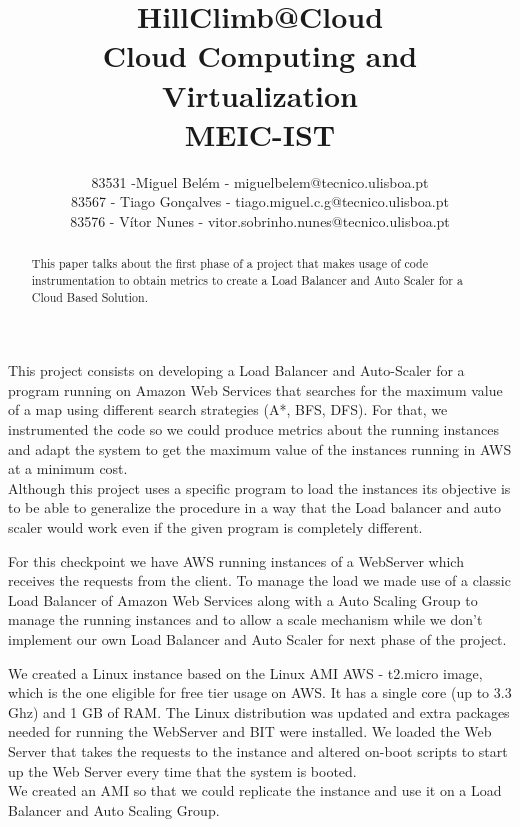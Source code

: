 \documentclass[times, 10pt,twocolumn]{article}
\begin{document}
\title{HillClimb@Cloud \\ Cloud Computing and Virtualization \\MEIC-IST }

\author{83531 -Miguel Belém - miguelbelem@tecnico.ulisboa.pt\\
83567 - Tiago Gonçalves - tiago.miguel.c.g@tecnico.ulisboa.pt\\
83576 - Vítor Nunes - vitor.sobrinho.nunes@tecnico.ulisboa.pt
}

\maketitle
\thispagestyle{empty}

\begin{abstract}
   This paper talks about the first phase of a project that makes usage of
   code instrumentation to obtain metrics to create a Load Balancer and 
   Auto Scaler for a Cloud Based Solution.
\end{abstract}

   This project consists on developing a Load Balancer and Auto-Scaler for 
   a program running on Amazon Web Services that searches for the maximum value 
   of a map using different search strategies (A*, BFS, DFS). For that, we instrumented
   the code so we could produce metrics about the running instances and adapt the system 
   to get the maximum value of the instances running in AWS at a minimum cost.\\
   Although this project uses a specific program to load the instances its objective 
   is to be able to generalize the procedure in a way that the Load balancer and 
   auto scaler would work even if the given program is completely different.


   For this checkpoint we have AWS running instances of a WebServer which 
   receives the requests from the client. To manage the load we made use of
   a classic Load Balancer of Amazon Web Services along with a Auto Scaling Group 
   to manage the running instances and to allow a scale mechanism while we don't 
   implement our own Load Balancer and Auto Scaler for next phase of the project.

   We created a Linux instance based on the Linux AMI AWS - t2.micro image, 
   which is the one eligible for free tier usage on AWS. It has a single core
   (up to 3.3 Ghz) and 1 GB of RAM. The Linux distribution was updated and
   extra packages needed for running the WebServer and BIT were installed.
   We loaded the Web Server that takes the requests to the instance and 
   altered on-boot scripts to start up the Web Server every time that
   the system is booted.\\
   We created an AMI so that we could replicate the instance and use it 
   on a Load Balancer and Auto Scaling Group.
\end{document}
